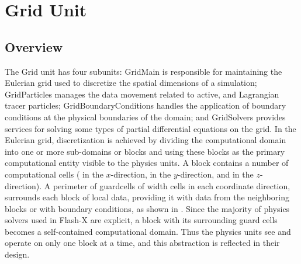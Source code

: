 
\chapter{Grid Unit}
\label{Chp:Grid Unit}


\section{Overview}
\label{Sec:GridIntroduction}

The \unit{Grid} unit has four subunits: \unit{GridMain} is responsible
for maintaining the Eulerian grid used to discretize the spatial dimensions of
a simulation; \unit{GridParticles} manages the data movement
related to active, and Lagrangian tracer particles;
\unit{GridBoundaryConditions}  
handles the application of boundary conditions at the physical
boundaries of the domain; 
and \unit{GridSolvers} provides services for solving some types
of partial differential equations on the grid. In the Eulerian grid,
discretization is achieved by dividing the computational domain into
one or more sub-domains or blocks%
and using these blocks
as the primary computational entity visible to the physics units.  A
block%
contains a number of computational cells
( in the $x$-direction,  in the $y$-direction, and
 in the $z$-direction). A perimeter of
guardcells%
of width  cells in each coordinate direction,
surrounds each block of local data, providing it with data from the
neighboring blocks or with boundary conditions, as shown in
. Since the majority of physics solvers
used in Flash-X are explicit, a block with its surrounding guard cells
becomes a self-contained computational domain. Thus the physics units
see and operate on only one block at a time, and this abstraction is
reflected in their design.

